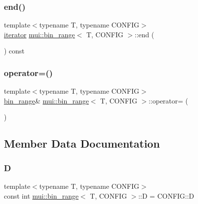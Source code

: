 \subsubsection{\texorpdfstring{end()}{end()}}
{\footnotesize\ttfamily template$<$typename T, typename C\+O\+N\+F\+IG$>$ \\
\hyperlink{structmui_1_1bin__range_ad39d02903689c0911cffe91dc8634297}{iterator} \hyperlink{structmui_1_1bin__range}{mui\+::bin\+\_\+range}$<$ T, C\+O\+N\+F\+IG $>$\+::end (\begin{DoxyParamCaption}{ }\end{DoxyParamCaption}) const\hspace{0.3cm}{\ttfamily [inline]}}

\mbox{\label{structmui_1_1bin__range_ad35f0c7c78571e7247cff2b4a381529e}} 
\subsubsection{\texorpdfstring{operator=()}{operator=()}}
{\footnotesize\ttfamily template$<$typename T, typename C\+O\+N\+F\+IG$>$ \\
\hyperlink{structmui_1_1bin__range}{bin\+\_\+range}\& \hyperlink{structmui_1_1bin__range}{mui\+::bin\+\_\+range}$<$ T, C\+O\+N\+F\+IG $>$\+::operator= (\begin{DoxyParamCaption}\item[{const \hyperlink{structmui_1_1bin__range}{bin\+\_\+range}$<$ T, C\+O\+N\+F\+IG $>$ \&}]{ }\end{DoxyParamCaption})\hspace{0.3cm}{\ttfamily [default]}}



\subsection{Member Data Documentation}
\mbox{\label{structmui_1_1bin__range_a808a42cd40f43cf33068640f6b86bf27}} 
\subsubsection{\texorpdfstring{D}{D}}
{\footnotesize\ttfamily template$<$typename T, typename C\+O\+N\+F\+IG$>$ \\
const int \hyperlink{structmui_1_1bin__range}{mui\+::bin\+\_\+range}$<$ T, C\+O\+N\+F\+IG $>$\+::D = C\+O\+N\+F\+I\+G\+::D\hspace{0.3cm}{\ttfamily [static]}}

